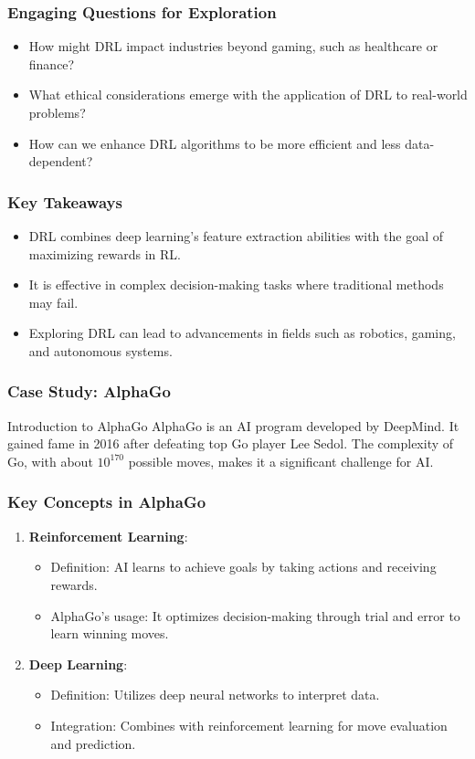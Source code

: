 \documentclass[aspectratio=169]{beamer}
\begin{document}
\begin{frame}[fragile]
    \frametitle{Engaging Questions for Exploration}
    \begin{itemize}
        \item How might DRL impact industries beyond gaming, such as healthcare or finance?
        \item What ethical considerations emerge with the application of DRL to real-world problems?
        \item How can we enhance DRL algorithms to be more efficient and less data-dependent?
    \end{itemize}
\end{frame}

\begin{frame}[fragile]
    \frametitle{Key Takeaways}
    \begin{itemize}
        \item DRL combines deep learning's feature extraction abilities with the goal of maximizing rewards in RL.
        \item It is effective in complex decision-making tasks where traditional methods may fail.
        \item Exploring DRL can lead to advancements in fields such as robotics, gaming, and autonomous systems.
    \end{itemize}
\end{frame}

\begin{frame}[fragile]
    \frametitle{Case Study: AlphaGo}
    \begin{block}{Introduction to AlphaGo}
        AlphaGo is an AI program developed by DeepMind. It gained fame in 2016 after defeating top Go player Lee Sedol. 
        The complexity of Go, with about $10^{170}$ possible moves, makes it a significant challenge for AI.
    \end{block}
\end{frame}

\begin{frame}[fragile]
    \frametitle{Key Concepts in AlphaGo}
    \begin{enumerate}
        \item \textbf{Reinforcement Learning}:
            \begin{itemize}
                \item Definition: AI learns to achieve goals by taking actions and receiving rewards.
                \item AlphaGo's usage: It optimizes decision-making through trial and error to learn winning moves.
            \end{itemize}
        \item \textbf{Deep Learning}:
            \begin{itemize}
                \item Definition: Utilizes deep neural networks to interpret data.
                \item Integration: Combines with reinforcement learning for move evaluation and prediction.
            \end{itemize}
    \end{enumerate}
\end{frame}
\end{document}
